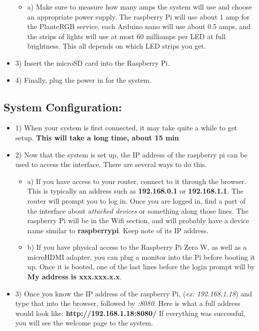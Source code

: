 \documentclass[onecolumn, draftclsnofoot,10pt, compsoc]{IEEEtran}
\begin{document}
\begin{itemize}
		\begin{itemize}
			\item a) Make sure to measure how many amps the system will use and choose an appropriate power supply. The raspberry Pi will use about 1 amp for the PlanteRGB service, each Arduino nano will use about 0.5 amps, and the strips of lights will use at most 60 milliamps per LED at full brightness. This all depends on which LED strips you get.
		\end{itemize}

		\item 3) Insert the microSD card into the Raspberry Pi.
		\item 4) Finally, plug the power in for the system.
	\end{itemize}


	\subsection{\textbf{System Configuration:}}
	\begin{itemize}
		\item 1) When your system is first connected, it may take quite a while to get setup. \textbf{This will take a long time, about 15 min}
		\item 2) Now that the system is set up, the IP address of the raspberry pi can be used to access the interface. There are several ways to do this.
		\begin{itemize}
			\item a) If you have access to your router, connect to it through the browser. This is typically an address such as \textbf{192.168.0.1} or \textbf{192.168.1.1}. The router will prompt you to log in. Once you are logged in, find a part of the interface about \textit{attached devices} or something along those lines. The raspberry Pi will be in the Wifi section, and will probably have a device name similar to \textbf{raspberrypi}. Keep note of its IP address.
			\item b) If you have physical access to the Raspberry Pi Zero W, as well as a microHDMI adapter, you can plug a monitor into the Pi before booting it up. Once it is booted, one of the last lines before the login prompt will by \textbf{My address is xxx.xxx.x.x}.
		\end{itemize}
		\item 3) Once you know the IP address of the raspberry Pi, (\textit{ex: 192.168.1.18}) and type that into the browser, followed by \textit{:8080}. Here is what a full address would look like: \textbf{http://192.168.1.18:8080/} If everything was successful, you will see the welcome page to the system.
	\end{itemize}
	
\end{document}
